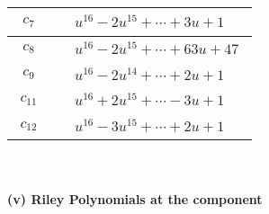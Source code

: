 \documentclass[1p]{elsarticle_modified}
\theoremstyle{definition}
\begin{document}
\begin{tabular}{m{50pt}|m{274pt}}
\hline $$\begin{aligned}c_{7}\end{aligned}$$&$\begin{aligned}
&u^{16}-2 u^{15}+\cdots+3 u+1
\end{aligned}$\\
\hline $$\begin{aligned}c_{8}\end{aligned}$$&$\begin{aligned}
&u^{16}-2 u^{15}+\cdots+63 u+47
\end{aligned}$\\
\hline $$\begin{aligned}c_{9}\end{aligned}$$&$\begin{aligned}
&u^{16}-2 u^{14}+\cdots+2 u+1
\end{aligned}$\\
\hline $$\begin{aligned}c_{11}\end{aligned}$$&$\begin{aligned}
&u^{16}+2 u^{15}+\cdots-3 u+1
\end{aligned}$\\
\hline $$\begin{aligned}c_{12}\end{aligned}$$&$\begin{aligned}
&u^{16}-3 u^{15}+\cdots+2 u+1
\end{aligned}$\\
\hline
\end{tabular}\\~\\
\newpage\renewcommand{\arraystretch}{1}
\flushleft \textbf{(v) Riley Polynomials at the component}\newline \\
\end{document}
